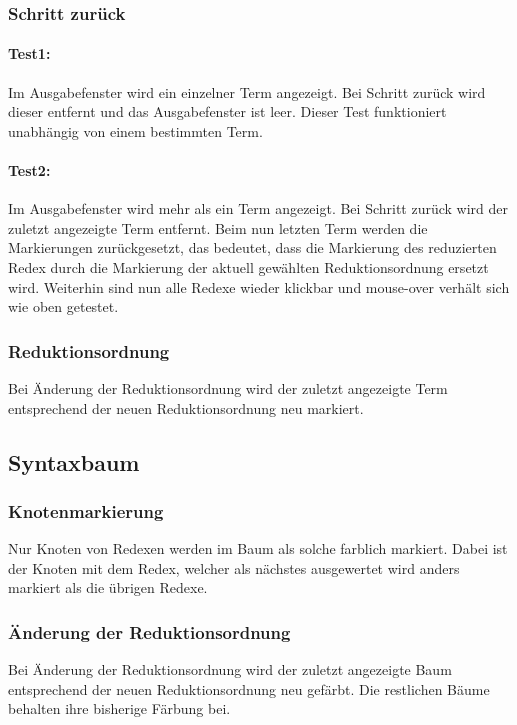 \documentclass[parskip=full,11pt,openany]{scrreprt}
\begin{document}
\subsubsection{Schritt zurück}
\paragraph{Test1:} 
Im Ausgabefenster wird ein einzelner Term angezeigt. Bei Schritt zurück wird dieser entfernt und das Ausgabefenster ist leer. 
Dieser Test funktioniert unabhängig von einem bestimmten Term.

\paragraph{Test2:} 
Im Ausgabefenster wird mehr als ein Term angezeigt. Bei Schritt zurück wird der zuletzt angezeigte Term entfernt.
Beim nun letzten Term werden die Markierungen zurückgesetzt, das bedeutet, dass die Markierung des reduzierten Redex durch die Markierung der aktuell gewählten Reduktionsordnung ersetzt wird. Weiterhin sind nun alle Redexe wieder klickbar und mouse-over verhält sich wie oben getestet.

\subsubsection{Reduktionsordnung}
Bei Änderung der Reduktionsordnung wird der zuletzt angezeigte Term entsprechend der neuen Reduktionsordnung neu markiert. 

\subsection{Syntaxbaum}
\subsubsection{Knotenmarkierung}
Nur Knoten von Redexen werden im Baum als solche farblich markiert. Dabei ist der Knoten mit dem Redex, welcher als nächstes ausgewertet wird anders markiert als die übrigen Redexe.

\subsubsection{Änderung der Reduktionsordnung}
Bei Änderung der Reduktionsordnung wird der zuletzt angezeigte Baum entsprechend der neuen Reduktionsordnung neu gefärbt. Die restlichen Bäume behalten ihre bisherige Färbung bei.
\end{document}
